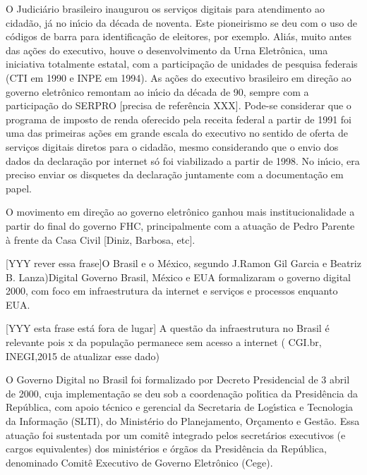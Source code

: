 \documentclass[
12pt,		%
openright,	%
twoside,  %
a4paper,			%
chapter=TITLE,		%
english,			%
french,				%
spanish,			%
brazil				%
]{USPSC-classe/USPSC}
\begin{document}
O Judici\'ario brasileiro inaugurou os servi\c{c}os digitais para atendimento ao cidad\~ao, j\'a no in\'{\i}cio da d\'ecada de noventa. Este pioneirismo se deu com o uso de c\'odigos de barra para identifica\c{c}\~ao de eleitores, por exemplo. Ali\'as, muito antes das a\c{c}\~oes do executivo, houve o desenvolvimento da Urna Eletr\^onica, uma iniciativa totalmente estatal, com a participa\c{c}\~ao de unidades de pesquisa federais (CTI em 1990 e INPE em 1994). As a\c{c}\~oes do executivo brasileiro em dire\c{c}\~ao ao governo eletr\^onico remontam ao in\'{\i}cio da d\'ecada de 90, sempre com a participa\c{c}\~ao do SERPRO [precisa de refer\^encia XXX]. Pode-se considerar que o programa de imposto de renda oferecido pela receita federal a partir de 1991 foi uma das primeiras a\c{c}\~oes em grande escala do executivo no sentido de oferta de servi\c{c}os digitais diretos para o cidad\~ao, mesmo considerando que o envio dos dados da declara\c{c}\~ao por internet s\'o foi viabilizado a partir de 1998. No in\'{\i}cio, era preciso enviar os disquetes da declara\c{c}\~ao juntamente com a documenta\c{c}\~ao em papel.




O movimento em dire\c{c}\~ao ao governo eletr\^onico ganhou mais institucionalidade a partir do final do governo FHC, principalmente com a atua\c{c}\~ao de Pedro Parente \`a frente da Casa Civil [Diniz, Barbosa, etc].




[YYY rever essa frase]O Brasil e o M\'exico, segundo J.Ramon Gil Garcia e Beatriz B. Lanza)Digital Governo Brasil, M\'exico e EUA formalizaram o governo digital 2000, com foco em infraestrutura da internet e servi\c{c}os e processos enquanto EUA.




[YYY esta frase est\'a fora de lugar] A quest\~ao da infraestrutura no Brasil \'e relevante pois x da popula\c{c}\~ao permanece sem acesso a internet ( CGI.br, INEGI,2015 de atualizar esse dado)




O Governo Digital no Brasil foi formalizado por Decreto Presidencial de 3 abril de 2000, cuja implementa\c{c}\~ao se deu sob a coordena\c{c}\~ao pol\'{\i}tica da Presid\^encia da Rep\'ublica, com apoio t\'ecnico e gerencial da Secretaria de Log\'{\i}stica e Tecnologia da Informa\c{c}\~ao (SLTI), do Minist\'erio do Planejamento, Or\c{c}amento e Gest\~ao. Essa atua\c{c}\~ao foi sustentada por um comit\^e integrado pelos secret\'arios executivos (e cargos equivalentes) dos minist\'erios e \'org\~aos da Presid\^encia da Rep\'ublica, denominado Comit\^e Executivo de Governo Eletr\^onico (Cege).
\end{document}

